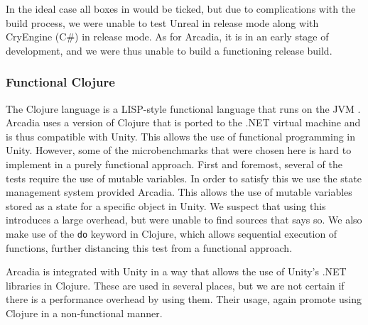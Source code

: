 In the ideal case all boxes in  would be ticked, but due to complications with the build process, we were unable to test Unreal in release mode along with CryEngine (C\#) in release mode. As for Arcadia, it is in an early stage of development, and we were thus unable to build a functioning release build.

\subsubsection{Functional Clojure}
The Clojure language is a LISP-style functional language that runs on the \ac{JVM} \cite{clojure:about}. Arcadia uses a version of Clojure that is ported to the .NET virtual machine and is thus compatible with Unity. This allows the use of functional programming in Unity. However, some of the microbenchmarks that were chosen here is hard to implement in a purely functional approach. First and foremost, several of the tests require the use of mutable variables. In order to satisfy this we use the state management system provided Arcadia. This allows the use of mutable variables stored as a state for a specific object in Unity. 
We suspect that using this introduces a large overhead, but were unable to find sources that says so.
We also make use of the \texttt{do} keyword in Clojure, which allows sequential execution of functions, further distancing this test from a functional approach.

Arcadia is integrated with Unity in a way that allows the use of Unity's .NET libraries in Clojure.
These are used in several places, but we are not certain if there is a performance overhead by using them.
Their usage, again promote using Clojure in a non-functional manner. 

